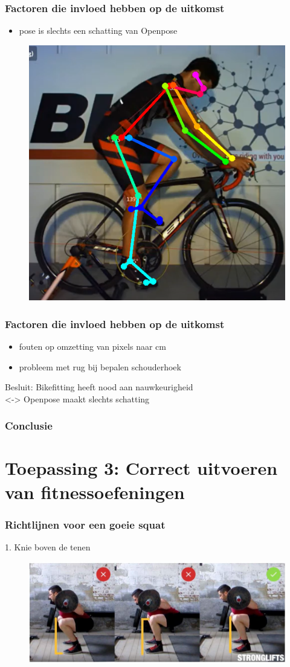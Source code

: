 \documentclass
   [kulak] %
   {kulakbeamer}
\begin{document}
\begin{frame}
	\frametitle{Factoren die invloed hebben op de uitkomst}
	\begin{itemize}
		\item pose is slechts een schatting van Openpose
	\end{itemize}
	\begin{figure}
	\includegraphics[width= .55\textwidth]{prof_bikefit}
	\end{figure}
\end{frame}

\begin{frame}
\frametitle{Factoren die invloed hebben op de uitkomst}
	\begin{itemize}
		\item fouten op omzetting van pixels naar \si{cm}
		\item probleem met rug bij bepalen schouderhoek
	\end{itemize}

Besluit: Bikefitting heeft nood aan nauwkeurigheid\\

<-> Openpose maakt slechts schatting
\end{frame}
\begin{frame}
	\frametitle{Conclusie}
\end{frame}


\section{Toepassing 3: Correct uitvoeren van fitnessoefeningen}

\begin{frame}
	\frametitle{Richtlijnen voor een goeie squat}
	1. Knie boven de tenen
	\begin{figure}
		\includegraphics[width= \textwidth]{squat_knie}
	\end{figure}
\end{frame}
\end{document}

